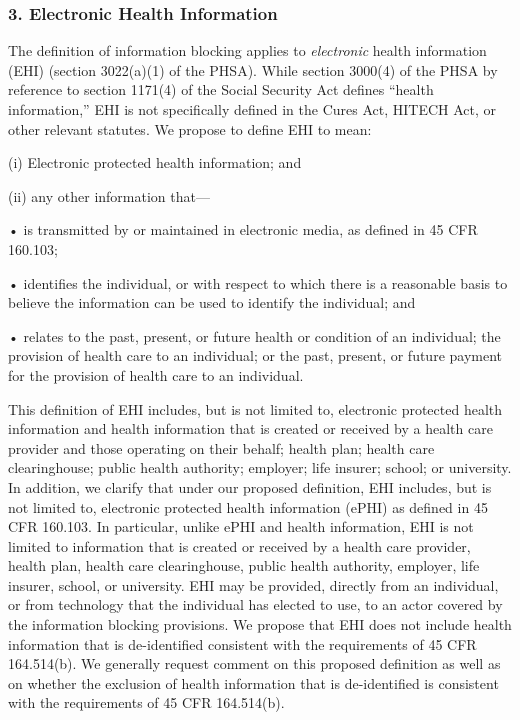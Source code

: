 \documentclass[twoside,11pt]{article}
\begin{document}
          \subsubsection{3. Electronic Health Information}

          The definition of information blocking applies to \emph{electronic} health information (EHI) (section 3022(a)(1) of the PHSA). While section 3000(4) of the PHSA by reference to section 1171(4) of the Social Security Act defines “health information,” EHI is not specifically defined in the Cures Act, HITECH Act, or other relevant statutes. We propose to define EHI to mean:


          (i) Electronic protected health information; and


          (ii) any other information that—


          • is transmitted by or maintained in electronic media, as defined in 45 CFR 160.103;


          • identifies the individual, or with respect to which there is a reasonable basis to believe the information can be used to identify the individual; and


          • relates to the past, present, or future health or condition of an individual; the provision of health care to an individual; or the past, present, or future payment for the provision of health care to an individual.


          This definition of EHI includes, but is not limited to, electronic protected health information and health information that is created or received by a health care provider and those operating on their behalf; health plan; health care clearinghouse; public health authority; employer; life insurer; school; or university. In addition, we clarify that under our proposed definition, EHI includes, but is not limited to, electronic protected health information (ePHI) as defined in 45 CFR 160.103. In particular, unlike ePHI and health information, EHI is not limited to information that is created or received by a health care provider, health plan, health care clearinghouse, public health authority, employer, life insurer, school, or university. EHI may be provided, directly from an individual, or from technology that the individual has elected to use, to an actor covered by the information blocking provisions. We propose that EHI does not include health information that is de-identified consistent with the requirements of 45 CFR 164.514(b). We generally request comment on this proposed definition as well as on whether the exclusion of health information that is de-identified is consistent with the requirements of 45 CFR 164.514(b).
\end{document}
